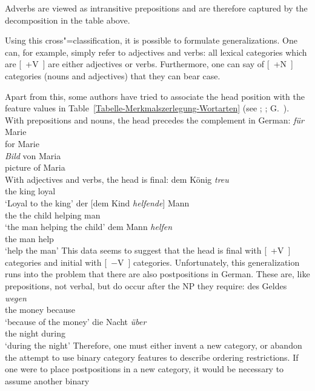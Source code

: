 \noindent
Adverbs are viewed as intransitive prepositions\label{Seite-Adverbien-PP} and are therefore captured by the decomposition in the
table above.

Using this cross"=classification, it is possible to formulate generalizations. One can, for example, simply refer to adjectives and
verbs: all lexical categories which are [~+V~] are either adjectives or verbs. Furthermore, one can
say of [~+N~] categories (nouns and adjectives) that they can bear case. 

Apart from this, some authors have tried to associate the head position with the feature values in Table~\ref{Tabelle-Merkmalszerlegung-Wortarten} (see \eg \citealp[]{Grewendorf88a};
\citealp[]{Haftka96a}; G.\ \citealp[]{GMueller2011a}). With prepositions and nouns,
the head precedes the complement in German:
\eal
\ex
\gll \emph{für} Marie\\
	 for Marie\\
\ex 
\gll \emph{Bild} von Maria\\
	 picture of Maria\\
\zl
With adjectives and verbs, the head is final:
\eal
\ex 
\gll dem König \emph{treu}\\
     the king loyal\\
\glt `Loyal to the king'
\ex 
\gll der [dem Kind \emph{helfende}] Mann\\
     the the child helping man\\
\glt `the man helping the child'
\ex 
\gll dem Mann \emph{helfen}\\
     the man help\\
\glt `help the man'
\zl
This data seems to suggest that the head is final with [~+V~] categories and initial with [~$-$V~] categories. Unfortunately, this
generalization runs into the problem that there are also postpositions in German. These are, like
prepositions, not verbal, but do occur after the NP they require: 
\eal
\ex 
\gll des Geldes \emph{wegen}\\
     the money because\\
\glt `because of the money'
\ex 
\gll die Nacht \emph{über}\\
     the night during\\
\glt `during the night'
\zl
Therefore, one must either invent a new category, or abandon the attempt to use binary category features to describe ordering restrictions.
If one were to place postpositions in a new category, it would be necessary to assume another binary
